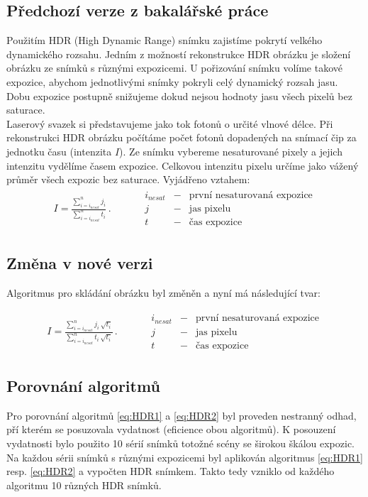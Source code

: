 \subsection{Předchozí verze z bakalářské práce}
\label{sec:hdr_image}
\indent	Použitím HDR (High Dynamic Range) snímku zajistíme pokrytí velkého dynamického rozsahu. Jedním z možností rekonstrukce HDR obrázku je složení obrázku ze snímků s různými expozicemi. U pořizování snímku volíme takové expozice, abychom jednotlivými snímky pokryli celý dynamický rozsah jasu. Dobu expozice postupně snižujeme dokud nejsou hodnoty jasu všech pixelů bez saturace.   \\
\indent	Laserový svazek si představujeme jako tok fotonů o určité vlnové délce. Při rekonstrukci HDR obrázku počítáme počet fotonů dopadených na snímací čip za jednotku času (intenzita $ I $). Ze snímku vybereme nesaturované pixely a jejich intenzitu vydělíme časem expozice. Celkovou intenzitu pixelu určíme jako vážený průměr všech expozic bez saturace. Vyjádřeno vztahem:  
\begin{eqnarray}
		I = \frac{\sum\limits_{i = i_{nesat}}^nj_i}{\sum\limits_{i =i_{nesat}}^nt_i}\,.
		\quad\quad\quad
		\begin{array}{ccc}
   		i_{nesat}&-&\mbox{první nesaturovaná expozice} \\
   		j&-&\mbox{jas pixelu} \\
   		t&-&\mbox{čas expozice} 
 		\end{array}
		\label{eq:HDR1}
\end{eqnarray}

\subsection{Změna v nové verzi}

Algoritmus pro skládání obrázku byl změněn a nyní má následující tvar:

\begin{eqnarray}
		I = \frac{\sum\limits_{i = i_{nesat}}^n j_i\,\sqrt{t_i}}{\sum\limits_{i =i_{nesat}}^n t_i\,\sqrt{t_i}}\,.
		\quad\quad\quad
		\begin{array}{ccc}
   		i_{nesat}&-&\mbox{první nesaturovaná expozice} \\
   		j&-&\mbox{jas pixelu} \\
   		t&-&\mbox{čas expozice} 
 		\end{array}
		\label{eq:HDR2}
\end{eqnarray}

\subsection{Porovnání algoritmů}
Pro porovnání algoritmů \ref{eq:HDR1} a \ref{eq:HDR2} byl proveden nestranný odhad, pří kterém se posuzovala vydatnost (eficience obou algoritmů). K posouzení vydatnosti bylo použito 10 sérií snímků totožné scény se širokou škálou expozic. Na každou sérii snímků s různými expozicemi byl aplikován algoritmus \ref{eq:HDR1} resp. \ref{eq:HDR2} a vypočten HDR snímkem. Takto tedy vzniklo od každého algoritmu 10 různých HDR snímků. 

